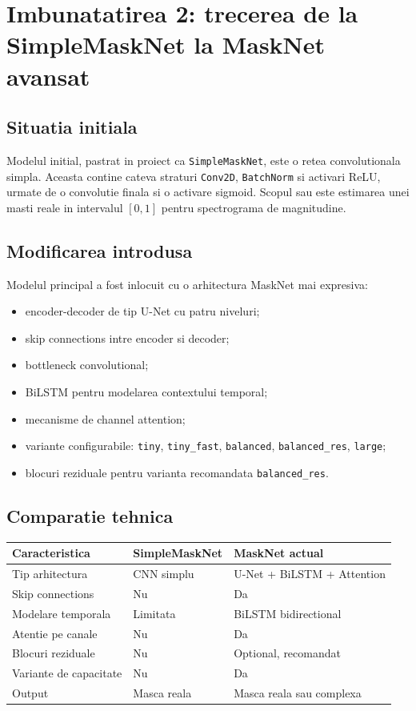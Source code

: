 \documentclass[12pt,a4paper]{article}
\begin{document}
\section{Imbunatatirea 2: trecerea de la SimpleMaskNet la MaskNet avansat}

\subsection{Situatia initiala}

Modelul initial, pastrat in proiect ca \texttt{SimpleMaskNet}, este o retea
convolutionala simpla. Aceasta contine cateva straturi \texttt{Conv2D},
\texttt{BatchNorm} si activari ReLU, urmate de o convolutie finala si o activare
sigmoid. Scopul sau este estimarea unei masti reale in intervalul $[0,1]$ pentru
spectrograma de magnitudine.

\subsection{Modificarea introdusa}

Modelul principal a fost inlocuit cu o arhitectura MaskNet mai expresiva:

\begin{itemize}
    \item encoder-decoder de tip U-Net cu patru niveluri;
    \item skip connections intre encoder si decoder;
    \item bottleneck convolutional;
    \item BiLSTM pentru modelarea contextului temporal;
    \item mecanisme de channel attention;
    \item variante configurabile: \texttt{tiny}, \texttt{tiny\_fast},
    \texttt{balanced}, \texttt{balanced\_res}, \texttt{large};
    \item blocuri reziduale pentru varianta recomandata \texttt{balanced\_res}.
\end{itemize}

\subsection{Comparatie tehnica}

\begin{center}
\begin{tabular}{lll}
\toprule
\textbf{Caracteristica} & \textbf{SimpleMaskNet} & \textbf{MaskNet actual} \\
\midrule
Tip arhitectura & CNN simplu & U-Net + BiLSTM + Attention \\
Skip connections & Nu & Da \\
Modelare temporala & Limitata & BiLSTM bidirectional \\
Atentie pe canale & Nu & Da \\
Blocuri reziduale & Nu & Optional, recomandat \\
Variante de capacitate & Nu & Da \\
Output & Masca reala & Masca reala sau complexa \\
\bottomrule
\end{tabular}
\end{center}
\end{document}
